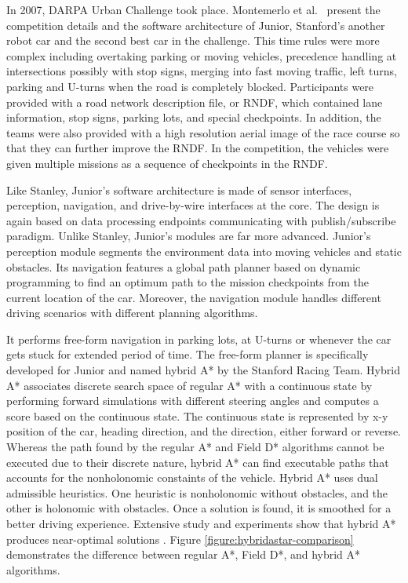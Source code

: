 In 2007, DARPA Urban Challenge took place. Montemerlo et al.\
\cite{Montemerlo2009JuniorTS} present the competition details and the software
architecture of Junior, Stanford's another robot car and the second best car in
the challenge. This time rules were more complex including overtaking parking
or moving vehicles, precedence handling at intersections possibly with stop
signs, merging into fast moving traffic, left turns, parking and U-turns when
the road is completely blocked. Participants were provided with a road network
description file, or RNDF, which contained lane information, stop signs,
parking lots, and special checkpoints. In addition, the teams were also
provided with a high resolution aerial image of the race course so that they
can further improve the RNDF. In the competition, the vehicles were given
multiple missions as a sequence of checkpoints in the RNDF.

Like Stanley, Junior's software architecture is made of sensor interfaces,
perception, navigation, and drive-by-wire interfaces at the core. The design
is again based on data processing endpoints communicating with
publish/subscribe paradigm. Unlike Stanley, Junior's modules are far more
advanced. Junior's perception module segments the environment data into moving
vehicles and static obstacles. Its navigation features a global path planner
based on dynamic programming to find an optimum path to the mission checkpoints
from the current location of the car. Moreover, the navigation module handles
different driving scenarios with different planning algorithms.

It performs free-form navigation in parking lots, at U-turns or whenever the
car gets stuck for extended period of time. The free-form planner is
specifically developed for Junior and named hybrid A* by the Stanford Racing
Team. Hybrid A* associates discrete search space of regular A* with a
continuous state by performing forward simulations with different steering
angles and computes a score based on the continuous state. The continuous state
is represented by x-y position of the car, heading direction, and the
direction, either forward or reverse. Whereas the path found by the regular A*
and Field D* algorithms cannot be executed due to their discrete nature, hybrid
A* can find executable paths that accounts for the nonholonomic constaints of
the vehicle. Hybrid A* uses dual admissible heuristics. One heuristic is
nonholonomic without obstacles, and the other is holonomic with obstacles. Once
a solution is found, it is smoothed for a better driving experience. Extensive
study and experiments show that hybrid A* produces near-optimal solutions
\cite{Dolgov2010PathPF, Petereit2012Application}. Figure
\ref{figure:hybridastar-comparison} demonstrates the difference between regular
A*, Field D*, and hybrid A* algorithms.

